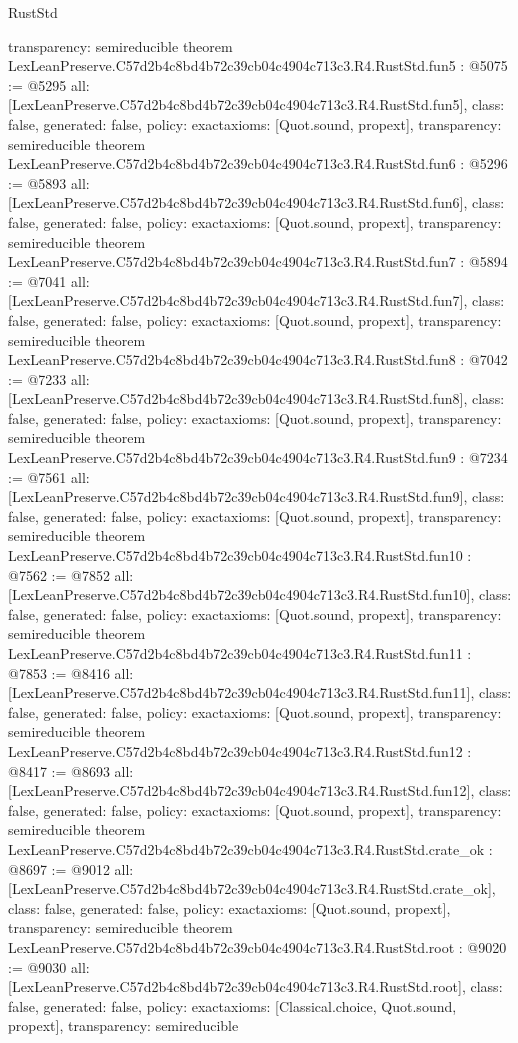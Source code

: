 \begin{lexlean}{RustStd}
\begin{coremodule}
{  transparency: semireducible
}
theorem LexLeanPreserve.C57d2b4c8bd4b72c39cb04c4904c713c3.R4.RustStd.fun5 : @5075 := @5295 {
  all: [LexLeanPreserve.C57d2b4c8bd4b72c39cb04c4904c713c3.R4.RustStd.fun5],
  class: false,
  generated: false,
  policy: exact{axioms: [Quot.sound, propext]},
  transparency: semireducible
}
theorem LexLeanPreserve.C57d2b4c8bd4b72c39cb04c4904c713c3.R4.RustStd.fun6 : @5296 := @5893 {
  all: [LexLeanPreserve.C57d2b4c8bd4b72c39cb04c4904c713c3.R4.RustStd.fun6],
  class: false,
  generated: false,
  policy: exact{axioms: [Quot.sound, propext]},
  transparency: semireducible
}
theorem LexLeanPreserve.C57d2b4c8bd4b72c39cb04c4904c713c3.R4.RustStd.fun7 : @5894 := @7041 {
  all: [LexLeanPreserve.C57d2b4c8bd4b72c39cb04c4904c713c3.R4.RustStd.fun7],
  class: false,
  generated: false,
  policy: exact{axioms: [Quot.sound, propext]},
  transparency: semireducible
}
theorem LexLeanPreserve.C57d2b4c8bd4b72c39cb04c4904c713c3.R4.RustStd.fun8 : @7042 := @7233 {
  all: [LexLeanPreserve.C57d2b4c8bd4b72c39cb04c4904c713c3.R4.RustStd.fun8],
  class: false,
  generated: false,
  policy: exact{axioms: [Quot.sound, propext]},
  transparency: semireducible
}
theorem LexLeanPreserve.C57d2b4c8bd4b72c39cb04c4904c713c3.R4.RustStd.fun9 : @7234 := @7561 {
  all: [LexLeanPreserve.C57d2b4c8bd4b72c39cb04c4904c713c3.R4.RustStd.fun9],
  class: false,
  generated: false,
  policy: exact{axioms: [Quot.sound, propext]},
  transparency: semireducible
}
theorem LexLeanPreserve.C57d2b4c8bd4b72c39cb04c4904c713c3.R4.RustStd.fun10 : @7562 := @7852 {
  all: [LexLeanPreserve.C57d2b4c8bd4b72c39cb04c4904c713c3.R4.RustStd.fun10],
  class: false,
  generated: false,
  policy: exact{axioms: [Quot.sound, propext]},
  transparency: semireducible
}
theorem LexLeanPreserve.C57d2b4c8bd4b72c39cb04c4904c713c3.R4.RustStd.fun11 : @7853 := @8416 {
  all: [LexLeanPreserve.C57d2b4c8bd4b72c39cb04c4904c713c3.R4.RustStd.fun11],
  class: false,
  generated: false,
  policy: exact{axioms: [Quot.sound, propext]},
  transparency: semireducible
}
theorem LexLeanPreserve.C57d2b4c8bd4b72c39cb04c4904c713c3.R4.RustStd.fun12 : @8417 := @8693 {
  all: [LexLeanPreserve.C57d2b4c8bd4b72c39cb04c4904c713c3.R4.RustStd.fun12],
  class: false,
  generated: false,
  policy: exact{axioms: [Quot.sound, propext]},
  transparency: semireducible
}
theorem LexLeanPreserve.C57d2b4c8bd4b72c39cb04c4904c713c3.R4.RustStd.crate_ok : @8697 := @9012 {
  all: [LexLeanPreserve.C57d2b4c8bd4b72c39cb04c4904c713c3.R4.RustStd.crate_ok],
  class: false,
  generated: false,
  policy: exact{axioms: [Quot.sound, propext]},
  transparency: semireducible
}
theorem LexLeanPreserve.C57d2b4c8bd4b72c39cb04c4904c713c3.R4.RustStd.root : @9020 := @9030 {
  all: [LexLeanPreserve.C57d2b4c8bd4b72c39cb04c4904c713c3.R4.RustStd.root],
  class: false,
  generated: false,
  policy: exact{axioms: [Classical.choice, Quot.sound, propext]},
  transparency: semireducible
}


\end{coremodule}
\end{lexlean}
